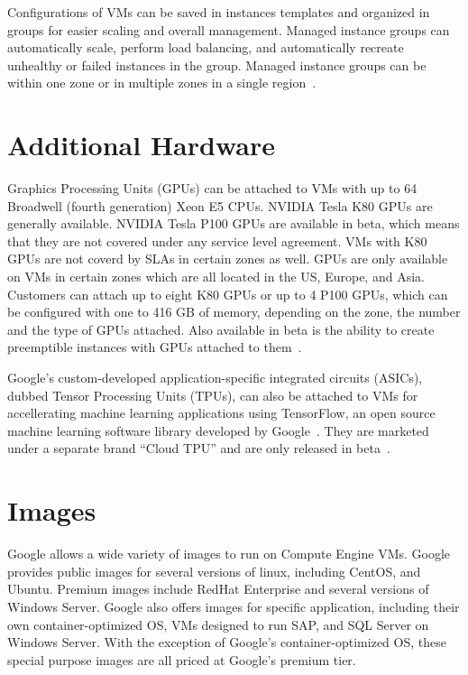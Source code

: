 Configurations of VMs can be saved in instances templates and organized in groups for easier scaling and overall management. Managed instance groups can automatically scale, perform load balancing, and automatically recreate unhealthy or failed instances in the group. Managed instance groups can be within one zone or in multiple zones in a single region~\cite{hid-sp18-419-gce-instance-groups}. 

\section{Additional Hardware}

Graphics Processing Units (GPUs) can be attached to VMs with up to 64
Broadwell (fourth generation) Xeon E5 CPUs. NVIDIA Tesla K80 GPUs are
generally available. NVIDIA Tesla P100 GPUs are available in beta,
which means that they are not covered under any service level
agreement. VMs with K80 GPUs are not coverd by SLAs in certain zones
as well. GPUs are only available on VMs in certain zones which are all
located in the US, Europe, and Asia. Customers can attach up to eight
K80 GPUs or up to 4 P100 GPUs, which can be configured with one to 416
GB of memory, depending on the zone, the number and the type of GPUs
attached. Also available in beta is the ability to create preemptible
instances with GPUs attached to them~\cite{hid-sp18-419-gce-gpus}.

Google's custom-developed application-specific integrated circuits
(ASICs), dubbed Tensor Processing Units (TPUs), can also be attached
to VMs for accellerating machine learning applications using
TensorFlow, an open source machine learning software library developed
by Google~\cite{hid-sp18-419-tensorflow}. They are marketed under a
separate brand ``Cloud TPU'' and are only released in
beta~\cite{hid-sp18-419-cloud-tpu}.

\section{Images}
Google allows a wide variety of images to run on Compute Engine
VMs. Google provides public images for several versions of linux,
including CentOS, and Ubuntu. Premium images include RedHat Enterprise
and several versions of Windows Server. Google also offers images for
specific application, including their own container-optimized OS, VMs
designed to run SAP, and SQL Server on Windows Server. With the
exception of Google's container-optimized OS, these special purpose
images are all priced at Google's premium tier.

